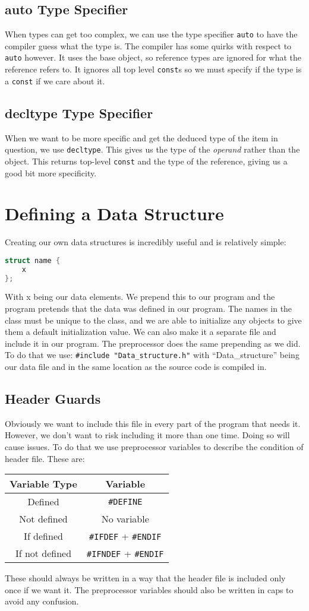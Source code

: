 \documentclass[12pt, a4paper]{report}
\begin{document}
\subsection{auto Type Specifier}
When types can get too complex, we can use the type specifier \verb|auto| to have the compiler guess what the type is. The compiler has some quirks with respect to \verb|auto| however. It uses the base object, so reference types are ignored for what the reference refers to. It ignores all top level \verb|const|s so we must specify if the type is a \verb|const| if we care about it.
\subsection{decltype Type Specifier}
When we want to be more specific and get the deduced type of the item in question, we use \verb|decltype|. This gives us the type of the \emph{operand} rather than the object. This returns top-level \verb|const| and the type of the reference, giving us a good bit more specificity.
\section{Defining a Data Structure}
Creating our own data structures is incredibly useful and is relatively simple:
\begin{lstlisting}[language=C++]
struct name {
	x
};
\end{lstlisting}
With x being our data elements. We prepend this to our program and the program pretends that the data was defined in our program. The names in the class must be unique to the class, and we are able to initialize any objects to give them a default initialization value. We can also make it a separate file and include it in our program. The preprocessor does the same prepending as we did. To do that we use: \verb|#include "Data_structure.h"| with ``Data\_structure'' being our data file and in the same location as the source code is compiled in.
\subsection{Header Guards}
Obviously we want to include this file in every part of the program that needs it. However, we don't want to risk including it more than one time. Doing so will cause issues. To do that we use preprocessor variables to describe the condition of header file. These are: 
\begin{center}
	\begin{tabular}{ |c|c| }
		\hline
		\textbf{Variable Type} & \textbf{Variable} \\
		\hline
		Defined & \verb|#DEFINE| \\
		\hline
		Not defined & No variable \\
		\hline
		If defined & \verb|#IFDEF| + \verb|#ENDIF| \\
		\hline
		If not defined & \verb|#IFNDEF| + \verb|#ENDIF| \\
		\hline
	\end{tabular}
\end{center}
These should always be written in a way that the header file is included only once if we want it. The preprocessor variables should also be written in caps to avoid any confusion.
\end{document}
